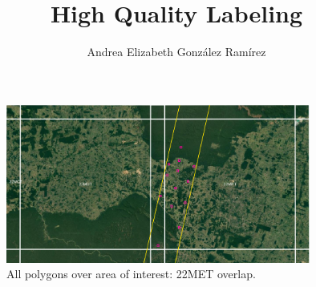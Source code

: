 \documentclass{beamer}
\title{High Quality Labeling}
\author{Andrea Elizabeth González Ramírez}
\begin{document}
\begin{frame}
    \titlepage
    \thispagestyle{empty}
\end{frame}

\section{}
\begin{frame}
    \begin{figure}
        \includegraphics[width=10cm]{Figures/v3/overlaping_polygons_1.png}
        \caption{All polygons over area of interest: 22MET overlap.}  
        \centering
    \end{figure}
\end{frame}
\end{document}
